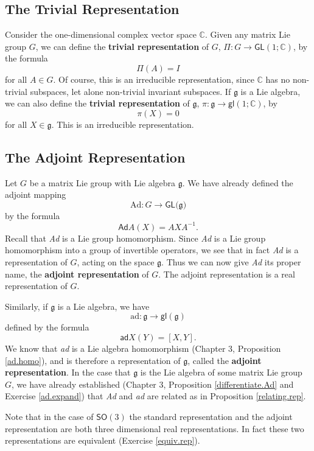 \documentclass[12pt]{amsbook}
\let \frak = \mathfrak
\theoremstyle{plain}
\numberwithin{equation}{chapter}
\numberwithin{theorem}{chapter}
\begin{document}
\subsection{The Trivial Representation}

Consider the one-dimensional complex vector space $\mathbb{C}$. Given any
matrix Lie group $G$, we can define the \textbf{trivial representation} of $G
$, $\Pi:G\rightarrow\mathsf{GL}(1;\mathbb{C})$, by the formula
\[
\Pi(A)=I
\]
for all $A\in G$. Of course, this is an irreducible representation, since
$\mathbb{C}$ has no non-trivial subspaces, let alone non-trivial invariant
subspaces. If $\frak{g}$ is a Lie algebra, we can also define the
\textbf{trivial representation} of $\frak{g}$, $\pi:\frak{g}\rightarrow
\mathsf{gl}(1;\mathbb{C})$, by
\[
\pi(X)=0
\]
for all $X\in\frak{g}$. This is an irreducible representation.

\subsection{The Adjoint Representation}

Let $G$ be a matrix Lie group with Lie algebra $\frak{g}$. We have already
defined the adjoint mapping
\[
\mathrm{Ad}:G\rightarrow\mathsf{GL}(\frak{g)}%
\]
by the formula
\[
\mathsf{Ad}A(X)=AXA^{-1}\text{.}%
\]
Recall that \textit{Ad} is a Lie group homomorphism. Since \textit{Ad} is a
Lie group homomorphism into a group of invertible operators, we see that in
fact \textit{Ad} is a representation of $G$, acting on the space $\frak{g}$.
Thus we can now give \textit{Ad} its proper name, the \textbf{adjoint
representation} of $G$. The adjoint representation is a real representation of
$G$.

Similarly, if $\frak{g}$ is a Lie algebra, we have
\[
\mathrm{ad}:\frak{g}\rightarrow\mathsf{gl}(\frak{g})
\]
defined by the formula
\[
\mathsf{ad}X(Y)=[X,Y]\text{.}%
\]
We know that \textit{ad} is a Lie algebra homomorphism (Chapter 3, Proposition
\ref{ad.homo}), and is therefore a representation of $\frak{g}$, called the
\textbf{adjoint representation}. In the case that $\frak{g}$ is the Lie
algebra of some matrix Lie group $G$, we have already established (Chapter 3,
Proposition \ref{differentiate.Ad} and Exercise \ref{ad.expand}) that
\textit{Ad} and \textit{ad} are related as in Proposition \ref{relating.rep}.

Note that in the case of $\mathsf{SO}(3)$ the standard representation and the
adjoint representation are both three dimensional real representations. In
fact these two representations are equivalent (Exercise \ref{equiv.rep}).
\end{document}
